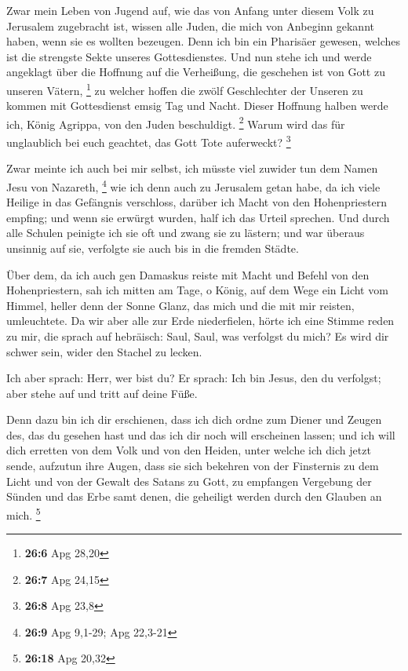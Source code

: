  Zwar mein Leben von Jugend auf, wie das von Anfang unter
diesem Volk zu Jerusalem zugebracht ist, wissen alle Juden,
 die mich von Anbeginn gekannt haben, wenn sie es wollten
bezeugen. Denn ich bin ein Pharisäer gewesen, welches ist die strengste
Sekte unseres Gottesdienstes.  Und nun stehe ich und werde
angeklagt über die Hoffnung auf die Verheißung, die geschehen ist von
Gott zu unseren Vätern, \footnote{\textbf{26:6} Apg 28,20}
 zu welcher hoffen die zwölf Geschlechter der Unseren zu
kommen mit Gottesdienst emsig Tag und Nacht. Dieser Hoffnung halben
werde ich, König Agrippa, von den Juden beschuldigt. \footnote{\textbf{26:7}
  Apg 24,15}  Warum wird das für unglaublich bei euch
geachtet, das Gott Tote auferweckt? \footnote{\textbf{26:8} Apg 23,8}

 Zwar meinte ich auch bei mir selbst, ich müsste viel
zuwider tun dem Namen Jesu von Nazareth, \footnote{\textbf{26:9} Apg
  9,1-29; Apg 22,3-21}  wie ich denn auch zu Jerusalem
getan habe, da ich viele Heilige in das Gefängnis verschloss, darüber
ich Macht von den Hohenpriestern empfing; und wenn sie erwürgt wurden,
half ich das Urteil sprechen.  Und durch alle Schulen
peinigte ich sie oft und zwang sie zu lästern; und war überaus unsinnig
auf sie, verfolgte sie auch bis in die fremden Städte.

 Über dem, da ich auch gen Damaskus reiste mit Macht und
Befehl von den Hohenpriestern,  sah ich mitten am Tage, o
König, auf dem Wege ein Licht vom Himmel, heller denn der Sonne Glanz,
das mich und die mit mir reisten, umleuchtete.  Da wir
aber alle zur Erde niederfielen, hörte ich eine Stimme reden zu mir, die
sprach auf hebräisch: Saul, Saul, was verfolgst du mich? Es wird dir
schwer sein, wider den Stachel zu lecken.

 Ich aber sprach: Herr, wer bist du? Er sprach: Ich bin
Jesus, den du verfolgst; aber stehe auf und tritt auf deine Füße.

 Denn dazu bin ich dir erschienen, dass ich dich ordne
zum Diener und Zeugen des, das du gesehen hast und das ich dir noch will
erscheinen lassen;  und ich will dich erretten von dem
Volk und von den Heiden, unter welche ich dich jetzt sende,
 aufzutun ihre Augen, dass sie sich bekehren von der
Finsternis zu dem Licht und von der Gewalt des Satans zu Gott, zu
empfangen Vergebung der Sünden und das Erbe samt denen, die geheiligt
werden durch den Glauben an mich. \footnote{\textbf{26:18} Apg 20,32}

